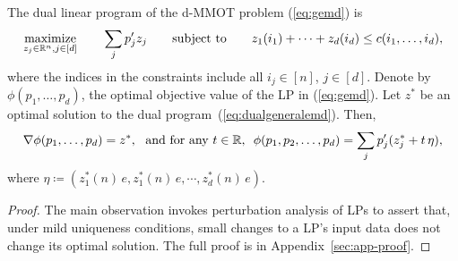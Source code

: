 
\begin{theorem}
The dual linear program of the d-MMOT problem (\ref{eq:gemd}) is
\begin{alignat}{2}\label{eq:dualgeneralemd}\begin{split}
\underset{z_j\in\mathbb{R}^n, j\in[d]}{\textrm{maximize}}\qquad\sum_{j} p_j'z_j 
\qquad \textrm{subject to}\qquad z_{1}(i_1)+\cdots+z_{d}(i_{d})\leq c(i_1,\ldots,i_{d}),\end{split}
\end{alignat}
where the indices in the constraints include all $i_j\in[n]$, $j\in[d]$.
Denote by $\phi(p_1,\ldots,p_d)$, the optimal objective value of the LP in (\ref{eq:gemd}). Let $z^*$ be an optimal solution to the dual program~(\ref{eq:dualgeneralemd}).
Then,
\begin{align*}
\nabla \phi(p_1,\ldots,p_{d}) = z^*, 
~~\text{and for any $t\in \mathbb{R}$,}~~
\phi(p_1,p_2,\ldots,p_{d}) = \sum_{j}p_j'
(z_j^* + t\, \eta),
\end{align*}
where $\eta\coloneqq (z_1^{*}(n)\,e, z^*_1(n)\,e, \cdots, z^*_{d}(n)\,e)$.
\label{thm:dualgrad}
\end{theorem}
\begin{proof}
The main observation invokes perturbation analysis \citep{mangasarian1979nonlinear,ferris1991finite} of LPs to assert that, under mild uniqueness conditions, small changes to a LP's input data does not change its optimal solution. The full proof is in Appendix~\ref{sec:app-proof}.
\end{proof}
